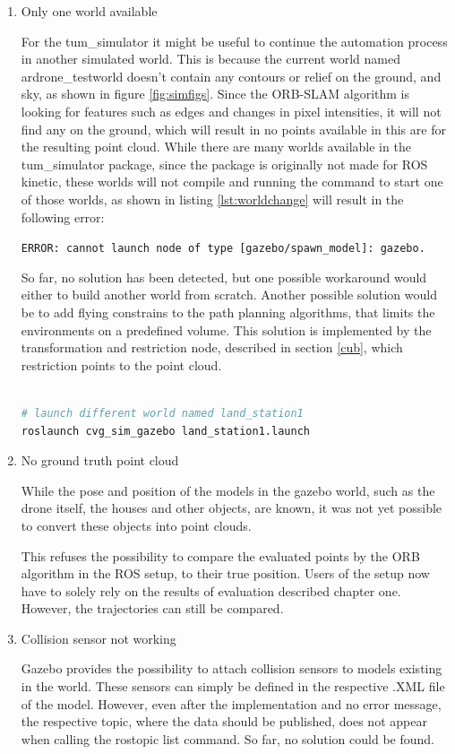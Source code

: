 	\begin{enumerate}
	
	\item{Only one world available}
	
	For the tum\_simulator it might be useful to continue the automation process in another simulated world. This is because the current world named ardrone\_testworld
	doesn't contain any contours or relief on the ground, and sky, as shown in figure \ref{fig:simfigs}. Since the ORB-SLAM algorithm is looking for features such as edges and changes in pixel intensities, 
	it will not find any on the ground, which will result in no points available in this are for the resulting point cloud. While there are many worlds available in the 
	tum\_simulator package, since the package is originally not made for ROS kinetic, these worlds will not compile and running the command to start one of those worlds, 
	as shown in listing \ref{lst:worldchange} will result in the following error: 
	
	\texttt{ERROR: cannot launch node of type [gazebo/spawn\_model]: gazebo.}
	
	So far, no solution has been detected, but one possible workaround would either to build another world from scratch. Another possible solution would be to add flying 
	constrains to the path planning algorithms, that limits the environments on a predefined volume. This solution is implemented by the transformation and restriction node, described in section 
	\ref{cub}, which restriction points to the point cloud. 
	
	
\begin{lstlisting}[language=bash, caption= Launching different world, label=lst:worldchange]
	
# launch different world named land_station1
roslaunch cvg_sim_gazebo land_station1.launch

\end{lstlisting}

	\item{No ground truth point cloud}
	
	While the pose and position of the models in the gazebo world, such as the drone itself, the houses and other objects, are known, it was not yet possible 
	to convert these objects into point clouds. 
	
	This refuses the possibility to compare the evaluated points by the ORB algorithm in the ROS setup, to their true position. Users of the setup now have to solely
	rely on the results of evaluation described chapter one. However, the trajectories can still be compared.
	
	\item{Collision sensor not working}

	Gazebo provides the possibility to attach collision sensors to models existing in the world. These sensors can simply be defined in the respective 
	.XML file of the model. However, even after the implementation and no error message, the respective topic, where the data should be published, 
	does not appear when calling the rostopic list command. So far, no solution could be found. 

	\end{enumerate}